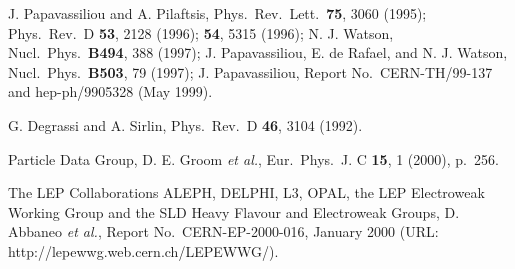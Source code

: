\documentclass[a4paper,12pt]{article}
\begin{document}
\begin{thebibliography}{99}
J. Papavassiliou and A. Pilaftsis,
Phys.\ Rev.\ Lett.\ {\bf75}, 3060 (1995); Phys.\ Rev.\ D {\bf53}, 2128 (1996);
{\bf54}, 5315 (1996); 
N. J. Watson, Nucl.\ Phys.\ {\bf B494}, 388 (1997);
J. Papavassiliou, E. de Rafael, and N. J. Watson, 
Nucl.\ Phys.\ {\bf B503}, 79 (1997); 
J. Papavassiliou,
Report No.\ CERN-TH/99-137 and hep-ph/9905328 (May 1999).

G. Degrassi and A. Sirlin,
Phys.\ Rev.\ D {\bf46}, 3104 (1992).

Particle Data Group, D. E. Groom {\it et al.},
Eur.\ Phys.\ J. C {\bf15}, 1 (2000), p.~256.

The LEP Collaborations ALEPH, DELPHI, L3, OPAL, the LEP Electroweak Working
Group and the SLD Heavy Flavour and Electroweak Groups, D. Abbaneo 
{\it et al.}, Report No.\ CERN-EP-2000-016, January 2000
(URL: http://lepewwg.web.cern.ch/LEPEWWG/).
 
\end{thebibliography}
\end{document}
